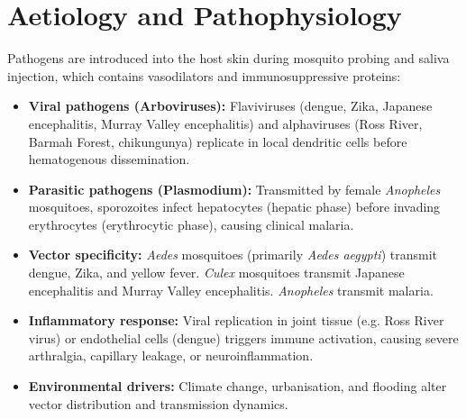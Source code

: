 \section*{Aetiology and Pathophysiology}
Pathogens are introduced into the host skin during mosquito probing and saliva injection, which contains vasodilators and immunosuppressive proteins:
\begin{itemize}
    \item \textbf{Viral pathogens (Arboviruses):} Flaviviruses (dengue, Zika, Japanese encephalitis, Murray Valley encephalitis) and alphaviruses (Ross River, Barmah Forest, chikungunya) replicate in local dendritic cells before hematogenous dissemination.
    \item \textbf{Parasitic pathogens (Plasmodium):} Transmitted by female \textit{Anopheles} mosquitoes, sporozoites infect hepatocytes (hepatic phase) before invading erythrocytes (erythrocytic phase), causing clinical malaria.
    \item \textbf{Vector specificity:} \textit{Aedes} mosquitoes (primarily \textit{Aedes aegypti}) transmit dengue, Zika, and yellow fever. \textit{Culex} mosquitoes transmit Japanese encephalitis and Murray Valley encephalitis. \textit{Anopheles} transmit malaria.
    \item \textbf{Inflammatory response:} Viral replication in joint tissue (e.g. Ross River virus) or endothelial cells (dengue) triggers immune activation, causing severe arthralgia, capillary leakage, or neuroinflammation.
    \item \textbf{Environmental drivers:} Climate change, urbanisation, and flooding alter vector distribution and transmission dynamics.
\end{itemize}

